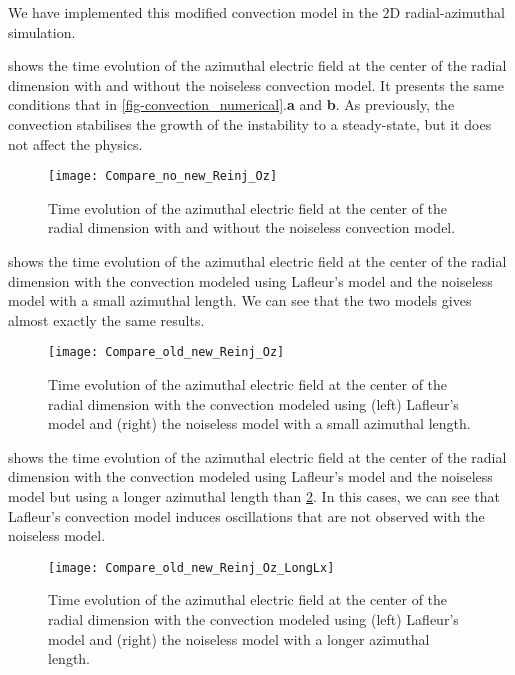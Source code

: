       We have implemented this modified convection model in the \ac{2D} radial-azimuthal simulation.
      
       shows the time  evolution of the azimuthal electric field at the center of the radial dimension with and without the noiseless convection model.
      It presents the same conditions that in \cref{fig-convection_numerical}.{\bf a} and {\bf b}. 
      As previously, the convection stabilises the growth of the instability to a steady-state, but it does not affect the physics.
       
      
      \begin{figure}[hbtp]
        \centering
        \texttt{[image: Compare\_no\_new\_Reinj\_Oz]}
        \caption{Time evolution of the azimuthal electric field at the center of the radial dimension with and without the noiseless convection model. }
        \label{fig-newconv_noconv}
      \end{figure}
      
       shows the  time  evolution of the azimuthal electric field at the center of the radial dimension  with the convection modeled using Lafleur's model and the noiseless model with a small azimuthal length.
      We can see that the two models gives almost exactly the same results.
      
      \begin{figure}[hbtp]
        \centering
        \texttt{[image: Compare\_old\_new\_Reinj\_Oz]}
        \caption{Time evolution of the azimuthal electric field at the center of the radial dimension with the convection modeled using (left) Lafleur's model and (right) the noiseless model with a small azimuthal length.}
        \label{fig-oldeconv_newconv}
      \end{figure}
      
      
       shows the  time  evolution of the azimuthal electric field at the center of the radial dimension  with the convection modeled using Lafleur's model and the noiseless model but using a longer azimuthal length than \cref{fig-oldeconv_newconv}.
      In this cases, we can see that Lafleur's convection model induces oscillations that are not observed with the noiseless model.
      
      \begin{figure}[hbtp]
        \centering
        \texttt{[image: Compare\_old\_new\_Reinj\_Oz\_LongLx]}
        \caption{Time evolution of the azimuthal electric field at the center of the radial dimension with the convection modeled using (left) Lafleur's model and (right) the noiseless model with a longer azimuthal length.}
        \label{fig-oldeconv_newconv_longLZ}
      \end{figure}
      


